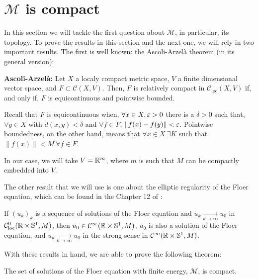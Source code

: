 \section{$\mathcal{M}$ is compact} \label{section:floerq_compact}

In this section we will tackle the first question about $\mathcal{M}$, in particular, its topology. To prove the results in this section and the next one, we will rely in two important results. The first is well known: the Ascoli-Arzelà theorem (in its general version):

\begin{theo} \label{ascoli_arzela}
{\bf Ascoli-Arzelà:} Let $X$ a localy compact metric space, $V$ a finite dimensional vector space, and $F \subset \mathcal{C}(X,V)$. Then, $F$ is relatively compact in $\mathcal{C}_{\text{loc}}(X,V)$ if, and only if, $F$ is equicontinuous and pointwise bounded.

Recall that $F$ is equicontinuous when, $\forall x \in X, \varepsilon > 0$ there is a $\delta > 0$ such that, $\forall y \in X$ with $d(x,y) < \delta$ and $\forall f \in F$, $\|f(x)-f(y)\| < \varepsilon$. Pointwise boundedness, on the other hand, means that $\forall x \in X \ \exists K$ such that $\|f(x)\| < M \ \forall f \in F$.
\end{theo}

In our case, we will take $V = \mathbb{R}^m$, where $m$ is such that $M$ can be compactly embedded into $V$. 

The other result that we will use is one about the elliptic regularity of the Floer equation, which can be found in the Chapter 12 of \cite{audin2014morse}:

\begin{prop} \label{floereq_ellipticreg}
If $(u_k)_k$ is a sequence of solutions of the Floer equation and $u_k \xrightarrow[k \rightarrow \infty]{} u_0$ in $\mathcal{C}_{\text{loc}}^0(\mathbb{R} \times \mathbb{S}^1,M)$, then $u_0 \in \mathcal{C}^{\infty}(\mathbb{R} \times \mathbb{S}^1,M)$, $u_0$ is also a solution of the Floer equation, and $u_k \xrightarrow[k \rightarrow \infty]{} u_0$ in the strong sense in $\mathcal{C}^{\infty}(\mathbb{R} \times \mathbb{S}^1,M)$.
\end{prop}

With these results in hand, we are able to prove the following theorem:

\begin{theo} \label{floer_compact}
The set of solutions of the Floer equation with finite energy, $\mathcal{M}$, is compact.
\end{theo}

